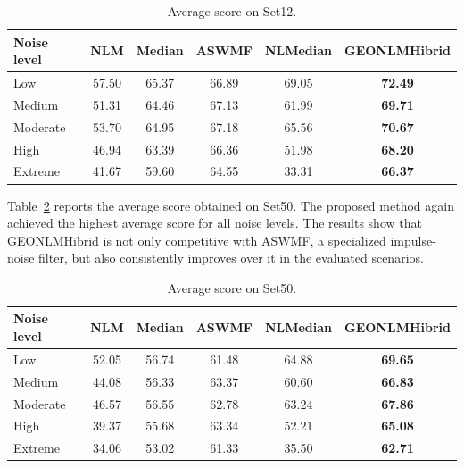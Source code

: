 \documentclass{ieeeaccess}
\begin{document}
\begin{table}[!t]
\centering
\caption{Average score on Set12.}
\label{tab:set12_score}
\begin{tabular}{lccccc}
\toprule
Noise level & NLM & Median & ASWMF & NLMedian & GEONLMHibrid \\
\midrule
Low      & 57.50 & 65.37 & 66.89 & 69.05 & \textbf{72.49} \\
Medium   & 51.31 & 64.46 & 67.13 & 61.99 & \textbf{69.71} \\
Moderate & 53.70 & 64.95 & 67.18 & 65.56 & \textbf{70.67} \\
High     & 46.94 & 63.39 & 66.36 & 51.98 & \textbf{68.20} \\
Extreme  & 41.67 & 59.60 & 64.55 & 33.31 & \textbf{66.37} \\
\bottomrule
\end{tabular}
\end{table}

Table~\ref{tab:set50_score} reports the average score obtained on Set50. The proposed method again achieved the highest average score for all noise levels. The results show that GEONLMHibrid is not only competitive with ASWMF, a specialized impulse-noise filter, but also consistently improves over it in the evaluated scenarios.

\begin{table}[!t]
\centering
\caption{Average score on Set50.}
\label{tab:set50_score}
\begin{tabular}{lccccc}
\toprule
Noise level & NLM & Median & ASWMF & NLMedian & GEONLMHibrid \\
\midrule
Low      & 52.05 & 56.74 & 61.48 & 64.88 & \textbf{69.65} \\
Medium   & 44.08 & 56.33 & 63.37 & 60.60 & \textbf{66.83} \\
Moderate & 46.57 & 56.55 & 62.78 & 63.24 & \textbf{67.86} \\
High     & 39.37 & 55.68 & 63.34 & 52.21 & \textbf{65.08} \\
Extreme  & 34.06 & 53.02 & 61.33 & 35.50 & \textbf{62.71} \\
\bottomrule
\end{tabular}
\end{table}
\end{document}
